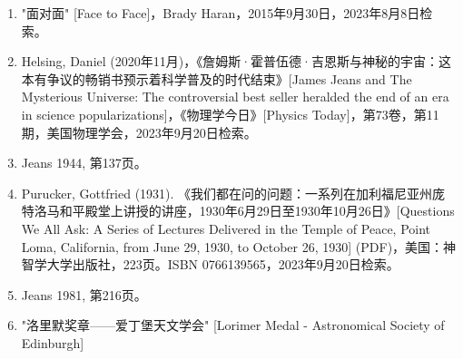 \begin{enumerate}
\item "面对面" [Face to Face]，Brady Haran，2015年9月30日，2023年8月8日检索。  
\item Helsing, Daniel (2020年11月)，《詹姆斯·霍普伍德·吉恩斯与神秘的宇宙：这本有争议的畅销书预示着科学普及的时代结束》[James Jeans and The Mysterious Universe: The controversial best seller heralded the end of an era in science popularizations]，《物理学今日》[Physics Today]，第73卷，第11期，美国物理学会，2023年9月20日检索。  
\item Jeans 1944, 第137页。  
\item Purucker, Gottfried (1931). 《我们都在问的问题：一系列在加利福尼亚州庞特洛马和平殿堂上讲授的讲座，1930年6月29日至1930年10月26日》[Questions We All Ask: A Series of Lectures Delivered in the Temple of Peace, Point Loma, California, from June 29, 1930, to October 26, 1930] (PDF)，美国：神智学大学出版社，223页。ISBN 0766139565，2023年9月20日检索。  
\item Jeans 1981, 第216页。  
\item "洛里默奖章——爱丁堡天文学会" [Lorimer Medal - Astronomical Society of Edinburgh]
\end{enumerate}